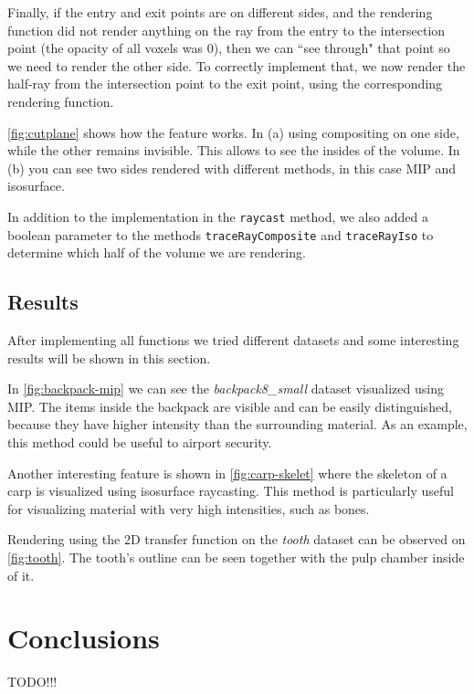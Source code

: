 \documentclass[a4paper]{article}
\begin{document}
Finally, if the entry and exit points are on different sides, and the rendering function did not render anything on the ray from the entry to the intersection point (the opacity of all voxels was $0$), then we can ``see through" that point so we need to render the other side. To correctly implement that, we now render the half-ray from the intersection point to the exit point, using the corresponding rendering function.

\autoref{fig:cutplane} shows how the feature works. In (a) using compositing on one side, while the other remains invisible. This allows to see the insides of the volume. In (b) you can see two sides rendered with different methods, in this case MIP and isosurface.

In addition to the implementation in the {\tt raycast} method, we also added a boolean parameter to the methods {\tt traceRayComposite} and {\tt traceRayIso} to determine  which half of the volume we are rendering.

\subsection{Results}

After implementing all functions we tried different datasets and some interesting results will be shown in this section.

In \autoref{fig:backpack-mip} we can see the \textit{backpack8\_small} dataset visualized using MIP. The items inside the backpack are visible and can be easily distinguished, because they have higher intensity than the surrounding material. As an example, this method could be useful to airport security.

Another interesting feature is shown in \autoref{fig:carp-skelet} where the skeleton of a carp is visualized using isosurface raycasting. This method is particularly useful for visualizing material with very high intensities, such as bones.

Rendering using the 2D transfer function on the \textit{tooth} dataset can be observed on \autoref{fig:tooth}. The tooth's outline can be seen together with the pulp chamber inside of it.

\section{Conclusions}

TODO!!!



\end{document}
